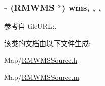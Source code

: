 \hypertarget{interface_r_m_w_m_s_source_a582f903e7f1723155103ef497decc6e9}{
\subsubsection[{wms}]{\setlength{\rightskip}{0pt plus 5cm}-\/ ({\bf R\-M\-W\-M\-S} $\ast$) wms\hspace{0.3cm}{\ttfamily [read]}, {\ttfamily [write]}, {\ttfamily [atomic]}, {\ttfamily [retain]}}}\label{interface_r_m_w_m_s_source_a582f903e7f1723155103ef497decc6e9}


参考自 tile\-U\-R\-L\-:.



该类的文档由以下文件生成\-:\begin{DoxyCompactItemize}
\item 
Map/\hyperlink{_r_m_w_m_s_source_8h}{R\-M\-W\-M\-S\-Source.\-h}\item 
Map/\hyperlink{_r_m_w_m_s_source_8m}{R\-M\-W\-M\-S\-Source.\-m}\end{DoxyCompactItemize}
